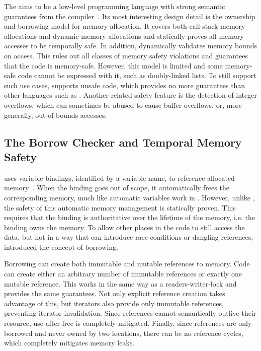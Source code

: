The  aims to be a low-level programming language with strong semantic guarantees from the compiler~\cite{rust-ref}. Its most interesting design detail is the ownership and borrowing model for memory allocation. It covers both \glspl{call-stack-memory-allocation} and \glspl{dynamic-memory-allocation} and statically proves all memory accesses to be temporally safe. In addition,  dynamically validates memory bounds on access. This rules out all classes of memory safety violations and guarantees that the code is memory-safe. However, this model is limited and some memory-safe code cannot be expressed with it, such as doubly-linked lists. To still support such use cases,  supports unsafe code, which provides no more guarantees than other languages such as . Another related safety feature is the detection of integer overflows, which can sometimes be abused to cause buffer overflows, or, more generally, out-of-bounds accesses.

\subsection{The Borrow Checker and Temporal Memory Safety}

 uses variable bindings, identified by a variable name, to reference allocated memory~\cite{rust-ref}. When the binding goes out of scope, it automatically frees the corresponding memory, much like automatic variables work in . However, unlike , the safety of this automatic memory management is statically proven. This requires that the binding is authoritative over the lifetime of the memory, i.e. the binding owns the memory. To allow other places in the code to still access the data, but not in a way that can introduce race conditions or dangling references,  introduced the concept of borrowing.

Borrowing can create both immutable and mutable references to memory. Code can create either an arbitrary number of immutable references or exactly one mutable reference. This works in the same way as a \gls{readers-writer-lock} and provides the same guarantees. Not only explicit reference creation takes advantage of this, but iterators also provide only immutable references, preventing iterator invalidation. Since references cannot semantically outlive their resource, \gls{use-after-free} is completely mitigated. Finally, since references are only borrowed and never owned by two locations, there can be no reference cycles, which completely mitigates memory leaks.

